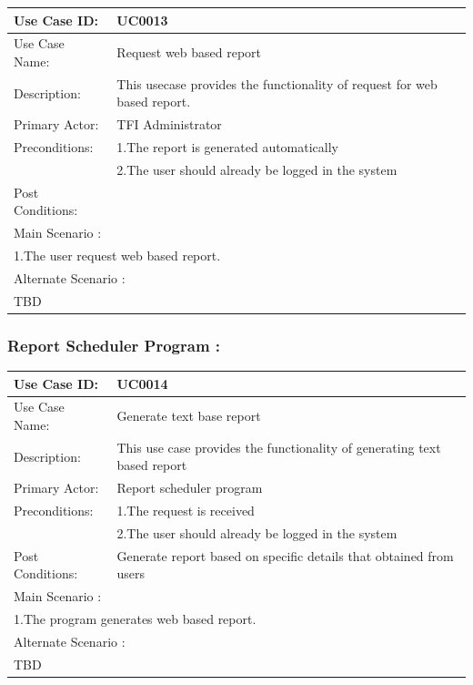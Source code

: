 \begin{center}
\vspace*{1\baselineskip}	
\begin{tabular}{|l|p{10cm}|}
	\hline
	Use Case ID: & UC0013 \\
	\hline
	Use Case Name: & Request web based report \\
	\hline
	Description: & This usecase provides the functionality of request for web based report. \\
	\hline
	Primary Actor: & TFI Administrator \\
	\hline
	Preconditions: & 1.The report is generated automatically\\ 
	& 2.The user should already be logged in the system \\
	\hline
	Post Conditions: & \\
	\hline
	\multicolumn{2}{|l|}{Main Scenario :} \\
	\hline
	\multicolumn{2}{|l|}{1.The user request web based report.} \\
	\hline
	\multicolumn{2}{|l|}{Alternate Scenario :} \\
	\hline
	\multicolumn{2}{|l|}{TBD} \\
	\hline
\end{tabular}
\end{center}

	\subsubsection{Report Scheduler Program :}
	\begin{center}
	\vspace*{1\baselineskip}	
	\begin{tabular}{|l|p{10cm}|}
		\hline
		Use Case ID: & UC0014 \\
		\hline
		Use Case Name: & Generate text base report \\
		\hline
		Description: & This use case provides the functionality of generating text based report \\
		\hline
		Primary Actor: & Report scheduler program \\
		\hline
		Preconditions: & 1.The request is received\\ 
		& 2.The user should already be logged in the system \\
		\hline
		Post Conditions: & Generate report based on specific details that obtained from users\\
		\hline
		\multicolumn{2}{|l|}{Main Scenario :} \\
		\hline
		\multicolumn{2}{|l|}{1.The program generates web based report.} \\
		\hline
		\multicolumn{2}{|l|}{Alternate Scenario :} \\
		\hline
		\multicolumn{2}{|l|}{TBD} \\
		\hline
	\end{tabular}
	\end{center}


